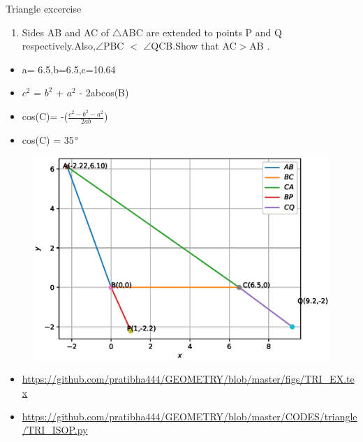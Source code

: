 \begin{frame}{Triangle excercise}
\begin{enumerate}
\item Sides AB and AC of $\triangle$ABC are extended to points P and Q respectively.Also,$\angle$PBC $<$ $\angle$QCB.Show that AC$>$AB .
\begin{center}

\end{center}
\end{enumerate}
\end{frame}
\begin{frame}
\begin{itemize}
\item a= 6.5,b=6.5,c=10.64
\item $c^2$ = $b^2$ + $a^2$ - 2abcos(B)
\item cos(C)= -($\frac{c^2 - b^2 -a^2}{2ab}$)
\item cos(C) = 35$\degree$

\seti
\end{itemize}
\end{frame}
\begin{frame}
\begin{center}
\begin{figure}
\includegraphics[scale=.4]{./figs/NEWTRI.eps}
\end{figure}
\end{center}
\begin{itemize}
\item \url{https://github.com/pratibha444/GEOMETRY/blob/master/figs/TRI_EX.tex}
\item \url{https://github.com/pratibha444/GEOMETRY/blob/master/CODES/triangle/TRI_ISOP.py}
\end{itemize}
\end{frame}



